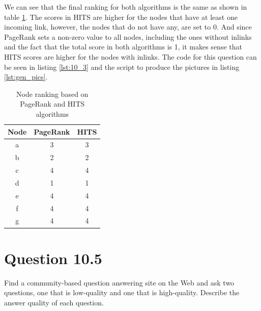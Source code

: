 \documentclass{article}
\begin{document}
We can see that the final ranking for both algorithms is the same as shown in table \ref{tb:rank_PR_HITS}. The scores in HITS are higher for the nodes that have at least one incoming link, however, the nodes that do not have any, are set to 0. And since PageRank sets a non-zero value to all nodes, including the ones without inlinks and the fact that the total score in both algorithms is 1, it makes sense that HITS scores are higher for the nodes with inlinks. The code for this question can be seen in listing \ref{lst:10_3} and the script to produce the pictures in listing \ref{lst:gen_pics}.
	\begin{table}[]
	\centering
	\caption{Node ranking based on PageRank and HITS algorithms}
	\label{tb:rank_PR_HITS}
	\begin{tabular}{|c|c|c|}
	\hline
	Node & PageRank & HITS \\ \hline
	a    & 3        & 3    \\ \hline
	b    & 2        & 2    \\ \hline
	c    & 4        & 4    \\ \hline
	d    & 1        & 1    \\ \hline
	e    & 4        & 4    \\ \hline
	f    & 4        & 4    \\ \hline
	g    & 4        & 4    \\ \hline
	\end{tabular}
	\end{table}
	
	
	
\section*{Question 10.5}
Find a community-based question answering site on the Web and ask two questions, one that is low-quality and one that is high-quality. Describe the answer quality of each question.
\end{document}
